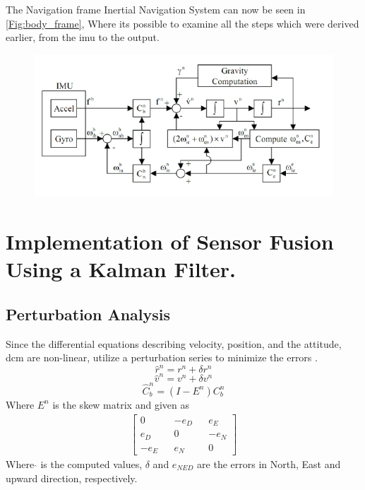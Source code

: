 The Navigation frame Inertial Navigation System can now be seen in \autoref{Fig:body_frame}, Where its possible to examine all the steps which were derived earlier, from the \gls{imu} to the output.
\begin{figure}[H]
\centering
\includegraphics[width=.9\textwidth]{Figures/ins_2.jpg}
\end{figure}

\section{Implementation of Sensor Fusion Using a Kalman Filter.}
\subsection{Perturbation Analysis}
Since the differential equations describing velocity, position, and the attitude, \gls{dcm} are non-linear, utilize a perturbation series to minimize the errors \cite{pertubation}.
\begin{equation}
\hat{r}^n =r^n+\delta r^n
\label{Eq.per_r}
\end{equation}
\begin{equation}
\hat{v}^n =v^n+\delta v^n
\label{Eq.per_v}
\end{equation}
\begin{equation}
\hat{C}_b^n = (I-E^n)C_b^n
\label{Eq.per_c}
\end{equation}
Where $E^n$ is the skew matrix and given as
\begin{align}
\begin{bmatrix} 
0 && -e_D && e_E \\
e_D && 0 && -e_N \\
-e_E && e_N && 0
\end{bmatrix}
\end{align}
Where $\hat{}$ is the computed values, $\delta$ and $e_{NED}$ are the errors in North, East and upward direction, respectively.

